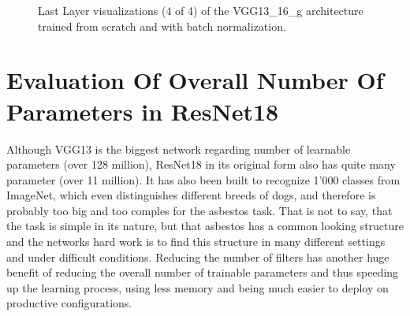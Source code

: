 \begin{figure}[H]
\centering
\caption{Last Layer visualizations (4 of 4) of the VGG13\_16\_g architecture trained from scratch and with batch normalization.}
\label{fig:vgg13_g_filter_activation}
\end{figure}



\section{Evaluation Of Overall Number Of Parameters in ResNet18}

Although VGG13 is the biggest network regarding number of learnable parameters (over 128 million), ResNet18 in its original form also has quite many parameter (over 11 million). It has also been built to recognize 1'000 classes from ImageNet, which even distinguishes different breeds of dogs, and therefore is probably too big and too comples for the asbestos task. That is not to say, that the task is simple in its nature, but that asbestos has a common looking structure and the networks hard work is to find this structure in many different settings and under difficult conditions. Reducing the number of filters has another huge benefit of reducing the overall number of trainable parameters and thus speeding up the learning process, using less memory and being much easier to deploy on productive configurations.\\

